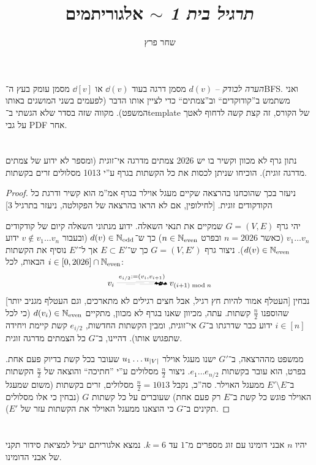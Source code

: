 \documentclass[]{../../../../tex/classes/homework}
\author{שחר פרץ}
\title{\textit{תרגיל בית 1} $\sim$ אלגוריתמים}
\begin{document}
	\maketitle
	
	\textit{הערה לבודק} – $d(v)$ מסמן דרגה בעוד $\dd(v)$ או $\dd[v]$ מסמן עומק בעץ ה־BFS. ואני משתמש ב''קודוקדים`` וב''צמתים`` כדי לציין אותו הדבר (לפעמים בשני המושגים באותו המשפט). מקווה שזה בסדר שלא הגשתי ב־template של הקורס, זה קצת קשה לדחוף לאטך על גבי PDF אחר. 
	
	\section{}
	נתון גרף לא מכוון וקשיר בו יש 2026 צמתים מדרגה אי־זוגית (ומספר לא ידוע של צמתים מדרגה זוגית). הוכיחו שניתן לכסות את כל הקשתות בגרף ע''י 1013 מסלולים זרים בקשתות. 
	
	\begin{proof}
		ניעזר בכך שהוכחנו בהרצאה שקיים מעגל אוילר בגרף אמ''מ הוא קשיר ודרגת כל הקודקודים זוגית. [לחילופין, אם לא הראו בהרצאה של הפקולטה, ניעזר בתרגיל 3]
		
		יהי גרף $G = (V, E)$ שמקיים את תנאי השאלה. ידוע מנתוני השאלה קיום של קודקודים $v_1 \dots v_n$ (כאשר $n = 2026$ ובפרט $n \in \mathbb{N}_{\mathrm{even}}$) כך ש־$d(v) \in \mathbb{N}_{\mathrm{odd }}$ (ובעבור $v \notin v_1 \dots v_n$ ידוע $d(v) \in \mathbb{N}_{\mathrm{even}}$). 
		ניצור גרף $G = (V, E')$ כך ש־$E \subset E'$ אך ל־$E'$ נוסיף את הקשתות הבאות, לכל $i \in [0, 2026] \cap \mathbb{N}_{\mathrm{even}}$: 
		\[ v_i \xrightflutteringbat{e_{i/2} := (v_i, v_{i + 1})} v_{(i + 1) \bmod n} \]
		[העטלף אמור להיות חץ רגיל, אבל חצים רגילים לא מתארכים, וגם העטלף מגניב יותר] נבחין שהוספנו ${\frac{n}{2}}$ קשתות. עתה, מכיוון שאנו בגרף לא מכוון, מתקיים $d(v_i) \in \mathbb{N}_{\mathrm{even}}$ (כי לכל $i \in [n]$ ידוע כבר שדרגתו ב־$G$ אי־זוגית, ומבין הקשתות החדשות, $e_{i/2}$ קשת קיימת ויחידה שתפגוש אותו). דהיינו, ב־$G$ כל הצמתים מדרגה זוגית. 
		
		ממשפט מההרצאה, ב־$G'$ ישנו מעגל אוילר $u_1 \dots u_{\left \lvert V \right \rvert}$ שעובר בכל קשת בדיוק פעם אחת. בפרט, הוא עובר בקשתות $e_1 \dots e_{n/2}$. ניצור $\frac{n}{2}$ מסלולים ע''י ''חתיכה`` והוצאה של $\frac{n}{2}$ הקשתות ב־$E' \setminus E$ ממעגל האוילר. סה''כ, נקבל $\frac{n}{2}  = 1013$ מסלולים, זרים בקשתות (משום שמעגל האוילר פוגש כל קשת ב־$E$ רק פעם אחת) שעוברים על כל קשתות $G$ (נבחין כי אלו מסלולים תקינים ב־$G$ כי הוצאנו ממעגל האוילר את הקשתות עזר של $E'$). 
	\end{proof}
	\npage
	
	\section{}
	יהיו $n$ אבני דומינו עם זוג מספרים מ־$1$ עד $k = 6$. נמצא אלגוריתם יעיל למציאת סידור תקני של אבני הדומינו. 
	
\end{document}
